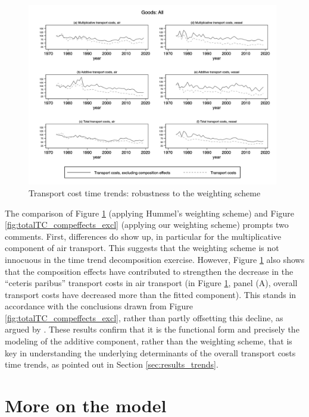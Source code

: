 \documentclass[a4paper,11pt]{article}
\begin{document}
\begin{figure}[htbp]
\caption{Transport cost time trends: robustness to the weighting scheme}
\label{fig:compeffects_robustness}
\begin{center}
\includegraphics[height=8cm]
{graph_composition_all_np.jpg}
\end{center}
\end{figure}

The comparison of Figure \ref{fig:compeffects_robustness} (applying Hummel's weighting scheme) and Figure \ref{fig:totalTC_compeffects_excl} (applying our weighting scheme) prompts two comments.
First, differences do show up, in particular for the multiplicative component of air transport.
This suggests that the weighting scheme is not innocuous in the time trend decomposition exercise.
However, Figure \ref{fig:compeffects_robustness} also shows that the composition effects have contributed to strengthen the decrease in the ``ceteris paribus'' transport costs in air transport (in Figure \ref{fig:compeffects_robustness}, panel (A), overall transport costs have decreased more than the fitted component). This stands in accordance with the conclusions drawn from Figure \ref{fig:totalTC_compeffects_excl}, rather than partly offsetting this decline, as argued by \cite{hummels2007}. These results confirm that it is the functional form and precisely the modeling of the additive component, rather than the weighting scheme, that is key in understanding the underlying determinants of the overall transport costs time trends, as pointed out in Section \ref{sec:results_trends}.


\section{More on the model \label{app:theoretical_model}}
\end{document}
